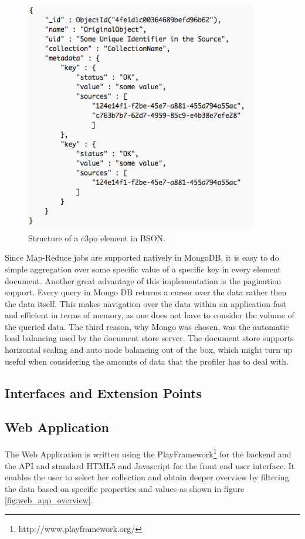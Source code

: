\begin{figure}[htb]
\begin{center}
\includegraphics[width=4in]{figures/architecture/document_structure.png}
\caption{Structure of a c3po element in BSON.}
\label{fig:document_structure}
\end{center}
\end{figure}

Since Map-Reduce jobs are supported natively in MongoDB, it is easy to do simple aggregation over some specific value of a specific key in every element document. Another great advantage of this implementation is the pagination support. Every query in Mongo DB returns a cursor over the data rather then the data itself. This makes navigation over the data within an application fast and efficient in terms of memory, as one does not have to consider the volume of the queried data.
The third reason, why Mongo was chosen, was the automatic load balancing used by the document store server. The document store supports horizontal scaling and auto node balancing out of the box, which might turn up useful when considering the amounts of data that the profiler has to deal with.

\subsection{Interfaces and Extension Points}

\subsection{Web Application}
The Web Application is written using the PlayFramework\footnote{http://www.playframework.org/} for the backend and the API and standard HTML5 and Javascript for the front end user interface. It enables the user to
select her collection and obtain deeper overview by filtering the data based on specific properties and values as shown in figure \ref{fig:web_app_overview}.

